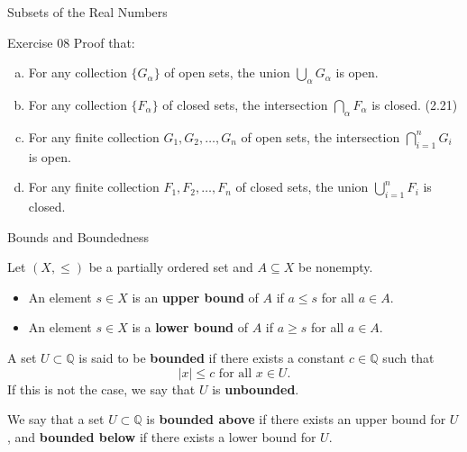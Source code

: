 \documentclass[dvipsnames]{beamer}
\theoremstyle{plain}
\theoremstyle{definition}
\begin{document}
\begin{frame}{Subsets of the Real Numbers}

\begin{block}{Exercise 08}
    Proof that:
\begin{enumerate}[(a)]
\item For any collection \( \{ G_\alpha \} \) of open sets, the union \( \bigcup_\alpha G_\alpha \) is open.

\item For any collection \( \{ F_\alpha \} \) of closed sets, the intersection \( \bigcap_\alpha F_\alpha \) is closed.
\hfill (2.21)

\item For any finite collection \( G_1, G_2, \dots, G_n \) of open sets, the intersection
\(\bigcap_{i=1}^n G_i\) is open.

\item For any finite collection \( F_1, F_2, \dots, F_n \) of closed sets, the union
\(\bigcup_{i=1}^n F_i\) is closed.
\end{enumerate}
\end{block}
\end{frame}

\begin{frame}{Bounds and Boundedness}

\begin{definition}
Let $(X,\le)$ be a partially ordered set and $A \subseteq X$ be nonempty.  
\begin{itemize}
    \item An element $s \in X$ is an \textbf{upper bound} of $A$ if $a \le s$ for all $a \in A$.
    \item An element $s \in X$ is a \textbf{lower bound} of $A$ if $a \ge s$ for all $a \in A$.
\end{itemize}
\end{definition}

\begin{definition}
A set \( U \subset \mathbb{Q} \) is said to be \textbf{bounded} if there exists a constant \( c \in \mathbb{Q} \) such that
\[
|x| \le c \text{ for all } x \in U.
\]
If this is not the case, we say that \( U \) is \textbf{unbounded}.
\end{definition}
We say that a set \( U \subset \mathbb{Q} \) is \textbf{bounded above} if there exists an upper bound
for \( U \), and \textbf{bounded below} if there exists a lower bound for \( U \).

\end{frame}
\end{document}
